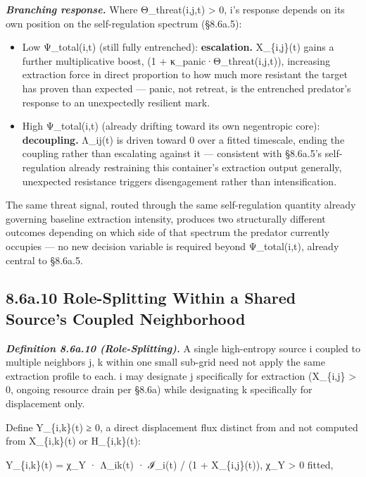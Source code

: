 \documentclass[
]{article}
\begin{document}
\emph{\textbf{Branching response.}} Where Θ\_threat(i,j,t)
\textgreater{} 0, i's response depends on its own position on the
self-regulation spectrum (§8.6a.5):

\begin{itemize}
\item
  Low Ψ\_total(i,t) (still fully entrenched): \textbf{escalation.}
  X\_\{i,j\}(t) gains a further multiplicative boost, (1 +
  κ\_panic·Θ\_threat(i,j,t)), increasing extraction force in direct
  proportion to how much more resistant the target has proven than
  expected --- panic, not retreat, is the entrenched predator's response
  to an unexpectedly resilient mark.
\item
  High Ψ\_total(i,t) (already drifting toward its own negentropic core):
  \textbf{decoupling.} Λ\_ij(t) is driven toward 0 over a fitted
  timescale, ending the coupling rather than escalating against it ---
  consistent with §8.6a.5's self-regulation already restraining this
  container's extraction output generally, unexpected resistance
  triggers disengagement rather than intensification.
\end{itemize}

The same threat signal, routed through the same self-regulation quantity
already governing baseline extraction intensity, produces two
structurally different outcomes depending on which side of that spectrum
the predator currently occupies --- no new decision variable is required
beyond Ψ\_total(i,t), already central to §8.6a.5.

\hypertarget{a.10-role-splitting-within-a-shared-sources-coupled-neighborhood}{%
\subsection{8.6a.10 Role-Splitting Within a Shared Source's Coupled
Neighborhood}\label{a.10-role-splitting-within-a-shared-sources-coupled-neighborhood}}

\emph{\textbf{Definition 8.6a.10 (Role-Splitting).}} A single
high-entropy source i coupled to multiple neighbors j, k within one
small sub-grid need not apply the same extraction profile to each. i may
designate j specifically for extraction (X\_\{i,j\} \textgreater{} 0,
ongoing resource drain per §8.6a) while designating k specifically for
displacement only.

Define Y\_\{i,k\}(t) ≥ 0, a direct displacement flux distinct from and
not computed from X\_\{i,k\}(t) or H\_\{i,k\}(t):

Y\_\{i,k\}(t) = χ\_Y · Λ\_ik(t) · ℐ\_i(t) / (1 + X\_\{i,j\}(t)), χ\_Y
\textgreater{} 0 fitted,
\end{document}
